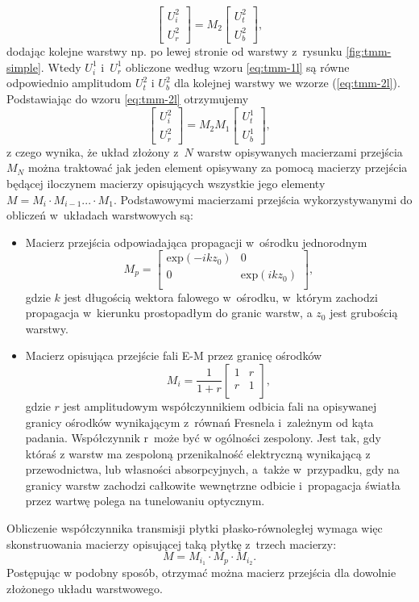 \begin{equation}
	\begin{bmatrix}
	U_i^2 \\ 
	U_r^2
	\end{bmatrix}
	= M_2 
	\begin{bmatrix}
	U_t^2 \\
	U_b^2
	\end{bmatrix},
\label{eq:tmm-2l}
\end{equation}
dodając kolejne warstwy np. po lewej stronie od warstwy z~rysunku \ref{fig:tmm-simple}. Wtedy $U_i^1$ i~$U_r^1$ obliczone według wzoru \ref{eq:tmm-1l} są równe odpowiednio amplitudom $U_t^2$ i $U_b^2$ dla kolejnej warstwy we wzorze (\ref{eq:tmm-2l}). Podstawiając do wzoru \ref{eq:tmm-2l} otrzymujemy 
\begin{equation}
\begin{bmatrix}
U_i^2 \\ 
U_r^2
\end{bmatrix}
=M_2 M_1 
\begin{bmatrix}
U_t^1 \\
U_b^1
\end{bmatrix},
\label{eq:tmm-2ls}
\end{equation}
z czego wynika, że układ złożony z~$N$ warstw opisywanych macierzami przejścia $M_N$ można traktować jak jeden element opisywany za pomocą macierzy przejścia będącej iloczynem macierzy opisujących wszystkie jego elementy $M= M_i \cdot M_{i-1} ... \cdot M_1$. Podstawowymi macierzami przejścia wykorzystywanymi do obliczeń w~układach warstwowych są:
\begin{itemize}
\item Macierz przejścia odpowiadająca propagacji w~ośrodku jednorodnym 
\begin{equation}
	M_p=
	\begin{bmatrix}
	\textrm{exp}(-i k z_0) & 0 \\
	0	&\textrm{exp}(i k z_0)\\
	\end{bmatrix},
\end{equation}
gdzie $k$ jest długością wektora falowego w~ośrodku, w~którym zachodzi propagacja w~kierunku prostopadłym do granic warstw, a $z_0$ jest grubością warstwy.
\item Macierz opisująca przejście fali E-M przez granicę ośrodków
\begin{equation}
	M_i=\frac{1}{1+r}
	\begin{bmatrix}
	1 &  r \\
	 r & 1\\
	\end{bmatrix},
\end{equation}
gdzie $r$ jest amplitudowym współczynnikiem odbicia fali na opisywanej granicy ośrodków wynikającym z~równań Fresnela i~zależnym od kąta padania. Współczynnik r~może być w ogólności zespolony. Jest tak, gdy któraś z warstw ma zespoloną przenikalność elektryczną wynikającą z przewodnictwa, lub własności absorpcyjnych, a~także w~przypadku, gdy na granicy warstw zachodzi całkowite wewnętrzne odbicie i~propagacja światła przez wartwę polega na tunelowaniu optycznym.
\end{itemize}

Obliczenie współczynnika transmisji płytki płasko-równoległej wymaga więc skonstruowania macierzy opisującej taką płytkę z~trzech macierzy: 
\[
M=M_{i_1} \cdot M_p \cdot  M_{i_2}.
\]
Postępując w podobny sposób, otrzymać można macierz przejścia dla dowolnie złożonego układu warstwowego. 
